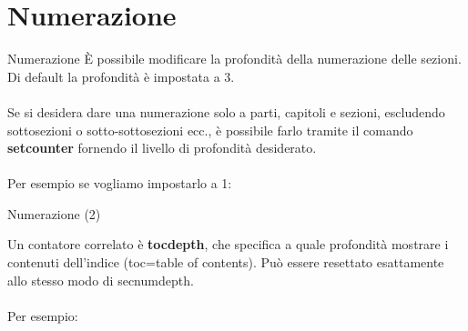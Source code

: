 \section{Numerazione}
\begin{frame}{Numerazione}
    È possibile modificare la profondità della numerazione delle sezioni. Di default la profondità è impostata a 3. \\\\Se si desidera dare una numerazione solo a parti, capitoli e sezioni, escludendo sottosezioni o sotto-sottosezioni ecc., è possibile farlo tramite il comando \textbf{\\setcounter} fornendo il livello di profondità desiderato.\\\\Per esempio se vogliamo impostarlo a 1:
    
    \texttt{\setcounter{secnumdepth}{1}}
    
\end{frame}
    
\begin{frame}{Numerazione (2)}

    Un contatore correlato è \textbf{tocdepth}, che specifica a quale profondità mostrare i contenuti dell'indice (toc=table of contents). Può essere resettato esattamente allo stesso modo di secnumdepth. \\\\Per esempio:
    
    \texttt{\setcounter{tocdepth}{3}}
\end{frame}


